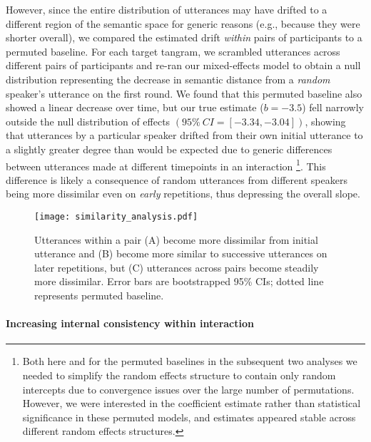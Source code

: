 However, since the entire distribution of utterances may have drifted to a different region of the semantic space for generic reasons (e.g., because they were shorter overall), we compared the estimated drift \emph{within} pairs of participants to a permuted baseline.
For each target tangram, we scrambled utterances across different pairs of participants and re-ran our mixed-effects model to obtain a null distribution representing the decrease in semantic distance from a \emph{random} speaker's utterance on the first round.
We found that this permuted baseline also showed a linear decrease over time, but our true estimate ($b=-3.5$) fell narrowly outside the null distribution of effects $(95\%~CI= [-3.34, -3.04])$, showing that utterances by a particular speaker drifted from their own initial utterance to a slightly greater degree than would be expected due to generic differences between utterances made at different timepoints in an interaction \footnote{Both here and for the permuted baselines in the subsequent two analyses we needed to simplify the random effects structure to contain only random intercepts due to convergence issues over the large number of permutations. However, we were interested in the coefficient estimate rather than statistical significance in these permuted models, and estimates appeared stable across different random effects structures.}.
This difference is likely a consequence of random utterances from different speakers being more dissimilar even on \emph{early} repetitions, thus depressing the overall slope.

\begin{figure}
\texttt{[image: similarity\_analysis.pdf]}
\caption{Utterances within a pair (A) become more dissimilar from initial utterance and (B) become more similar to successive utterances on later repetitions, but (C) utterances across pairs become steadily more dissimilar. Error bars are bootstrapped 95\% CIs; dotted line represents permuted baseline.}
\label{fig:similarity}
\end{figure}

\paragraph{Increasing internal consistency within interaction}

